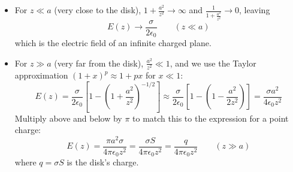 \documentclass[11pt, a4paper]{article}
\newcommand{\ee}{\epsilon_{0}}  %
\begin{document}
\begin{itemize}
	\item For $ z \ll a $ (very close to the disk), $ 1 + \frac{a^{2}}{z^{2}} \to \infty $ and $ \frac{1}{1 + \frac{a^{2}}{z^{2}}} \to 0$, leaving \vspace{-2mm}
	\begin{equation*}
		E(z) \to \frac{\sigma}{2\ee} \qquad (z \ll a)
	\end{equation*}
	which is the electric field of an infinite charged plane.
	
	\item For $ z \gg a $ (very far from the disk), $ \frac{a^{2}}{z^{2}} \ll 1 $, and we use the Taylor approximation $ (1 + x)^{p} \approx 1 + px $ for $ x \ll 1 $:
	\begin{equation*}
		E(z) = \frac{\sigma}{2\ee} \left[1 -  \left (1 + \frac{a^{2}}{z^{2}}\right )^{-1/2}\right] \approx \frac{\sigma}{2\ee}\left[ 1 - \left(1 - \frac{a^{2}}{2z^{2}}\right) \right] = \frac{\sigma a^{2}}{4\ee z^{2}}
	\end{equation*}
	Multiply above and below by $ \pi $ to match this to the expression for a point charge:
	\begin{equation*}
		E(z) = \frac{\pi a^{2} \sigma}{4\pi \ee z^{2}} = \frac{\sigma S}{4\pi \ee z^{2}} = \frac{q}{4\pi \ee z^{2}}  \qquad (z \gg a) 
	\end{equation*}
	where $ q = \sigma S $ is the disk's charge. 

\end{itemize}
\end{document}
